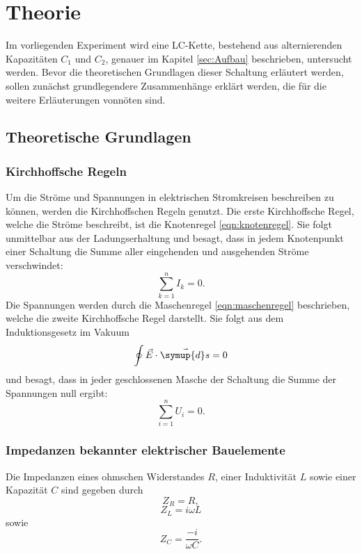 \section{Theorie}
Im vorliegenden Experiment wird eine LC-Kette, bestehend aus alternierenden Kapazitäten $C_1$ und $C_2$, genauer im Kapitel \ref{sec:Aufbau} beschrieben, untersucht werden.
Bevor die theoretischen Grundlagen dieser Schaltung erläutert werden, sollen zunächst grundlegendere Zusammenhänge erklärt werden, die für die weitere Erläuterungen vonnöten sind.
\label{sec:Theorie}
\subsection{Theoretische Grundlagen}
\subsubsection{Kirchhoffsche Regeln}
Um die Ströme und Spannungen in elektrischen Stromkreisen beschreiben zu können, werden die Kirchhoffschen Regeln genutzt.
Die erste Kirchhoffsche Regel, welche die Ströme beschreibt, ist die Knotenregel \eqref{eqn:knotenregel}.
Sie folgt unmittelbar aus der Ladungserhaltung und besagt, dass in jedem Knotenpunkt einer Schaltung die Summe aller eingehenden und ausgehenden Ströme verschwindet:
\begin{equation}
  \sum_{k=1}^n I_k = 0.
  \label{eqn:knotenregel}
\end{equation}
Die Spannungen werden durch die Maschenregel \eqref{eqn:maschenregel} beschrieben, welche die zweite Kirchhoffsche Regel darstellt.
Sie folgt aus dem Induktionsgesetz im Vakuum
\begin{equation}
\oint \vec{E} \cdot \vec{\symup{d}s} = 0
\end{equation}
und besagt, dass in jeder geschlossenen Masche der Schaltung die Summe der Spannungen null ergibt:
\begin{equation}
  \sum_{i=1}^n U_i = 0.
  \label{eqn:maschenregel}
\end{equation}
\subsubsection{Impedanzen bekannter elektrischer Bauelemente}
\label{sec:impedanzen}
Die Impedanzen eines ohmschen Widerstandes $R$, einer Induktivität $L$ sowie einer Kapazität $C$ sind gegeben durch
\begin{equation}
  Z_R = R,
\end{equation}
\begin{equation}
  Z_L = i \omega L
\end{equation}
sowie
\begin{equation}
  Z_C = \frac{-i}{\omega C}.
\end{equation}

